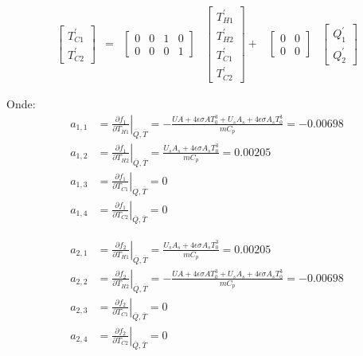 \begin{equation}
\begin{aligned}
\begin{bmatrix}
			T_{C1}^{'}	\\
			T_{C2}^{'}
		\end{bmatrix}
		&=&
		\begin{bmatrix}
			0	&	0	&	1	&	0	\\
			0	&	0	&	0	&	1
		\end{bmatrix}
		&
		\begin{bmatrix}
			T_{H1}^{'}	\\
			T_{H2}^{'}	\\
			T_{C1}^{'}	\\
			T_{C2}^{'}
		\end{bmatrix}
		+&
		\begin{bmatrix}
			0	&	0	\\
			0	&	0
		\end{bmatrix}
		&
		\begin{bmatrix}
			Q_{1}^{'}		\\
			Q_{2}^{'}
		\end{bmatrix}
	\end{aligned}
\end{equation}

\noindent
Onde:
\begin{equation*}
	\begin{aligned}
		a_{1,1} &= \left. \frac{\partial f_1}{\partial T_{H1}} \right|_{\overline{Q},\overline{T}} = 
				  - \frac{UA + 4 \epsilon \sigma A T_0^3 + U_s A_s + 4 \epsilon \sigma A_s T_0^3}{m C_p} = 
				  -0.00698		
				  \\
		a_{1,2} &= \left. \frac{\partial f_1}{\partial T_{H2}} \right|_{\overline{Q},\overline{T}} = 
				  \frac{U_s A_s + 4 \epsilon \sigma A_s T_0^3}{m C_p} = 
				  0.00205
				  \\
		a_{1,3} &= \left. \frac{\partial f_1}{\partial T_{C1}} \right|_{\overline{Q},\overline{T}} = 
				  0
				  \\
		a_{1,4} &= \left. \frac{\partial f_1}{\partial T_{C2}} \right|_{\overline{Q},\overline{T}} = 
				  0
	\end{aligned}
\end{equation*}

\begin{equation*}
	\begin{aligned}
		a_{2,1} &= \left. \frac{\partial f_2}{\partial T_{H1}} \right|_{\overline{Q},\overline{T}} = 
				  \frac{U_s A_s + 4 \epsilon \sigma A_s T_0^3}{m C_p} = 
				  0.00205
				  \\
		a_{2,2} &= \left. \frac{\partial f_2}{\partial T_{H2}} \right|_{\overline{Q},\overline{T}} = 
				  - \frac{UA + 4 \epsilon \sigma A T_0^3 + U_s A_s + 4 \epsilon \sigma A_s T_0^3}{m C_p} = 
				  -0.00698		
				  \\
		a_{2,3} &= \left. \frac{\partial f_2}{\partial T_{C1}} \right|_{\overline{Q},\overline{T}} = 
				  0
				  \\
		a_{2,4} &= \left. \frac{\partial f_2}{\partial T_{C2}} \right|_{\overline{Q},\overline{T}} = 
				  0
	\end{aligned}
\end{equation*}

